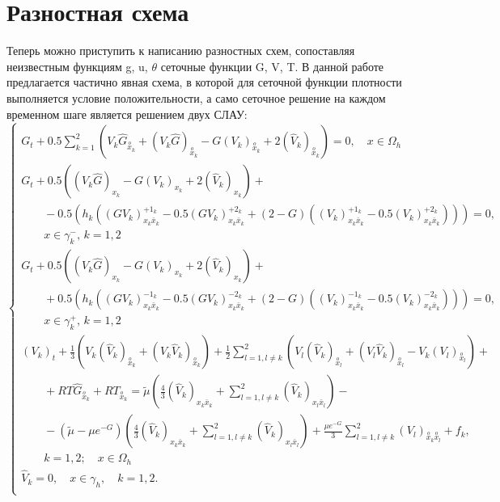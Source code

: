 \documentclass[a4paper]{article}
\theoremstyle{definition}
\numberwithin{equation}{section}
\begin{document}
\section{Разностная схема}
Теперь можно приступить к написанию разностных схем, сопоставляя неизвестным функциям g, u, $\theta$ сеточные функции G, V, T. В данной работе предлагается частично явная схема, в которой для сеточной функции плотности выполняется условие положительности, а само сеточное решение на каждом временном шаге является решением двух СЛАУ:
$$\begin{cases}
G_t + 0.5\sum\limits_{k=1}^2\left(V_k\hat{G}_{\stackrel{o}{x}_k} + (V_k\hat{G})_{\stackrel{o}{x}_k} - G(V_k)_{\stackrel{o}{x}_k} + 2(\hat{V}_k)_{\stackrel{o}{x}_k}\right) = 0, \quad x\in\Omega_h\\
G_t + 0.5 \left( (V_k\hat{G})_{x_k} - G(V_k)_{x_k} + 2(\hat{V}_k)_{x_k}\right) + \\ \qquad - 0.5 \left( h_k\left( (GV_k)_{x_k\bar{x}_k}^{+1_k} - 0.5(GV_k)_{x_k\bar{x}_k}^{+2_k} + (2-G)((V_k)_{x_k\bar{x}_k}^{+1_k} - 0.5(V_k)_{x_k\bar{x}_k}^{+2_k})\right) \right) = 0, \\ \qquad x\in\gamma_k^-, \, k=1,2\\
G_t + 0.5 \left( (V_k\hat{G})_{x_k} - G(V_k)_{x_k} + 2(\hat{V}_k)_{x_k}\right) + \\ \qquad + 0.5\left( h_k\left( (GV_k)_{x_k\bar{x}_k}^{-1_k} - 0.5(GV_k)_{x_k\bar{x}_k}^{-2_k} + (2-G)((V_k)_{x_k\bar{x}_k}^{-1_k} - 0.5(V_k)_{x_k\bar{x}_k}^{-2_k})\right) \right) = 0, \\ \qquad  x\in\gamma_k^+, \, k=1,2\\
(V_k)_t + \frac{1}{3}\left( V_k(\hat{V}_k)_{\stackrel{o}{x}_k} + (V_k\hat{V}_k)_{\stackrel{o}{x}_k} \right) + \frac{1}{2} \sum\limits_{l=1, l\neq k}^2 \left( V_l(\hat{V}_k)_{\stackrel{o}{x}_l} + (V_l\hat{V}_k)_{\stackrel{o}{x}_l} - V_k(V_l)_{\stackrel{o}{x}_l} \right) + \\ \qquad + RT\hat{G}_{\stackrel{o}{x}_k} + RT_{\stackrel{o}{x}_k} = \tilde{\mu}\left(\frac{4}{3}(\hat{V}_k)_{x_k\bar{x}_k} + \sum\limits_{l=1,l\neq k}^2 (\hat{V}_k)_{x_l\bar{x}_l} \right) - \\ \qquad - (\tilde{\mu} -\mu e^{-G}) \left( \frac{4}{3}(\hat{V}_k)_{x_k\bar{x}_k} + \sum\limits_{l=1,l\neq k}^2 (\hat{V}_k)_{x_l\bar{x}_l} \right) + \frac{\mu e^{-G}}{3} \sum\limits_{l=1,l\neq k}^2 (V_l)_{\stackrel{o}{x}_k\stackrel{o}{x}_l} + f_k, \\ \qquad k=1,2;\quad x\in\Omega_h\\
\hat{V}_k=0, \quad x\in\gamma_h, \quad k=1,2. \\

\end{cases}$$
\end{document}
